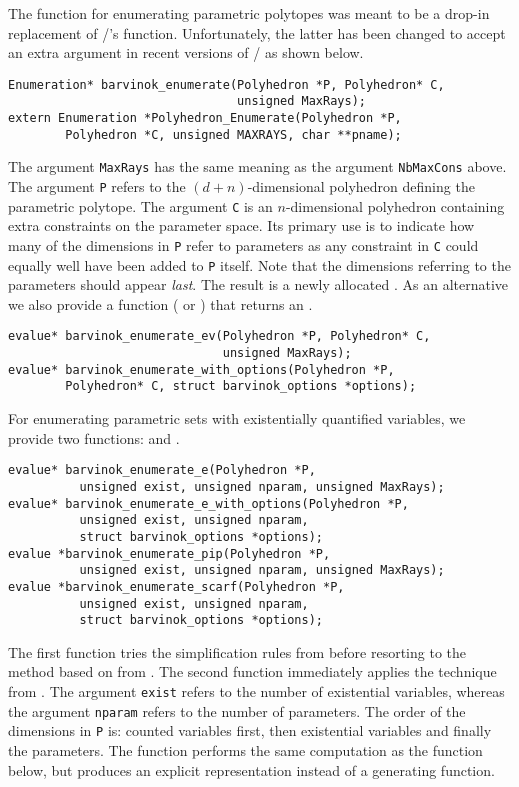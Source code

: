 The function  for enumerating
parametric polytopes was meant to be
a drop-in replacement of \PolyLib/'s 
function.
Unfortunately, the latter has been changed to
accept an extra argument in recent versions of \PolyLib/ as shown below.
\begin{verbatim}
Enumeration* barvinok_enumerate(Polyhedron *P, Polyhedron* C, 
                                unsigned MaxRays);
extern Enumeration *Polyhedron_Enumerate(Polyhedron *P,
	    Polyhedron *C, unsigned MAXRAYS, char **pname);
\end{verbatim}
The argument \verb+MaxRays+ has the same meaning as the argument
\verb+NbMaxCons+ above.
The argument \verb+P+ refers to the $(d+n)$-dimensional
polyhedron defining the parametric polytope.
The argument \verb+C+ is an $n$-dimensional polyhedron containing
extra constraints on the parameter space.
Its primary use is to indicate how many of the dimensions
in \verb+P+ refer to parameters as any constraint in \verb+C+
could equally well have been added to \verb+P+ itself.
Note that the dimensions referring to the parameters should
appear {\em last}.
The result is a newly allocated .
As an alternative we also provide a function 
( or
) that returns
an .
\begin{verbatim}
evalue* barvinok_enumerate_ev(Polyhedron *P, Polyhedron* C, 
                              unsigned MaxRays);
evalue* barvinok_enumerate_with_options(Polyhedron *P,
        Polyhedron* C, struct barvinok_options *options);
\end{verbatim}

For enumerating parametric sets with existentially quantified variables,
we provide two functions:
and
.
\begin{verbatim}
evalue* barvinok_enumerate_e(Polyhedron *P,
          unsigned exist, unsigned nparam, unsigned MaxRays);
evalue* barvinok_enumerate_e_with_options(Polyhedron *P, 
          unsigned exist, unsigned nparam,
          struct barvinok_options *options);
evalue *barvinok_enumerate_pip(Polyhedron *P,
          unsigned exist, unsigned nparam, unsigned MaxRays);
evalue *barvinok_enumerate_scarf(Polyhedron *P,
          unsigned exist, unsigned nparam,
          struct barvinok_options *options);
\end{verbatim}
The first function tries the simplification rules from
 before resorting to the method
based on  from .
The second function immediately applies the technique from
.
The argument \verb+exist+ refers to the number of existential variables,
whereas
the argument \verb+nparam+ refers to the number of parameters.
The order of the dimensions in \verb+P+ is:
counted variables first, then existential variables and finally
the parameters.
The function  performs the same
computation as the function 
below, but produces an explicit representation instead of a generating function.

